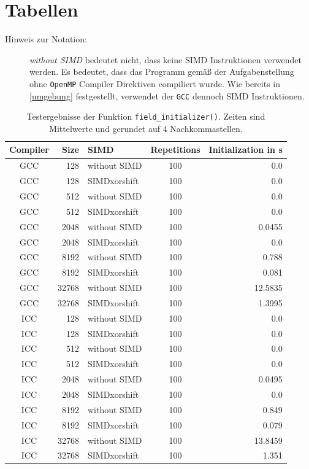 \documentclass[german,plainarticle,hyperref,utf8]{zihpub}
\begin{document}
	\section{Tabellen} \label{tables}
	\begin{description}
		\item[Hinweis zur Notation:] \textit{without SIMD} bedeutet nicht, dass keine SIMD Instruktionen verwendet werden. Es bedeutet, dass das Programm gemäß der Aufgabenstellung ohne \texttt{OpenMP} Compiler Direktiven compiliert wurde. Wie bereits in \ref{umgebung} festgestellt, verwendet der \texttt{GCC} dennoch SIMD Instruktionen.
	\end{description}
	\begin{table}[h]
		\centering
			\begin{tabular}{|| c r l c r ||}
				\hline
				Compiler & Size  & SIMD & Repetitions & Initialization in s \\ [1ex]
				\hline\hline
				GCC & 128 & without SIMD & 100 & 0.0 \\ \hline
				GCC & 128 & SIMDxorshift & 100 & 0.0 \\ \hline
				GCC & 512 & without SIMD & 100 & 0.0 \\ \hline
				GCC & 512 & SIMDxorshift & 100 & 0.0 \\ \hline
				GCC & 2048 & without SIMD & 100 & 0.0455 \\ \hline
				GCC & 2048 & SIMDxorshift & 100 & 0.0 \\ \hline
				GCC & 8192 & without SIMD & 100 & 0.788 \\ \hline
				GCC & 8192 & SIMDxorshift & 100 & 0.081 \\ \hline
				GCC & 32768 & without SIMD & 100 & 12.5835 \\ \hline
				GCC & 32768 & SIMDxorshift & 100 & 1.3995 \\ \hline \hline
				ICC & 128 & without SIMD & 100 & 0.0 \\ \hline
				ICC & 128 & SIMDxorshift & 100 & 0.0 \\ \hline
				ICC & 512 & without SIMD & 100 & 0.0 \\ \hline
				ICC & 512 & SIMDxorshift & 100 & 0.0 \\ \hline
				ICC & 2048 & without SIMD & 100 & 0.0495 \\ \hline
				ICC & 2048 & SIMDxorshift & 100 & 0.0 \\ \hline
				ICC & 8192 & without SIMD & 100 & 0.849 \\ \hline
				ICC & 8192 & SIMDxorshift & 100 & 0.079 \\ \hline
				ICC & 32768 & without SIMD & 100 & 13.8459 \\ \hline
				ICC & 32768 & SIMDxorshift & 100 & 1.351 \\ \hline
			\end{tabular}
			\caption{\label{tab:init}Testergebnisse der Funktion \texttt{field\_initializer()}. Zeiten sind Mittelwerte und gerundet auf 4 Nachkommastellen.}
	\end{table}
\end{document}

